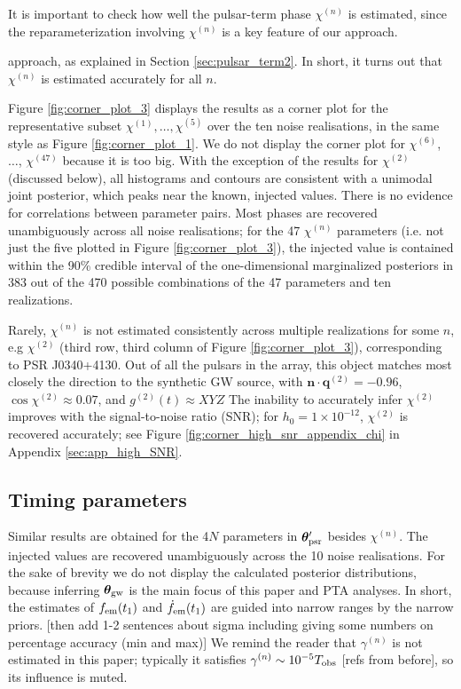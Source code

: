 \documentclass[fleqn,usenatbib,useAMS]{mnras}
\begin{document}
 It is important to check how well the pulsar-term phase $\chi^{(n)}$ is estimated, since the reparameterization involving $\chi^{(n)}$ is a key feature of our approach. 
 
 approach, as explained in Section \ref{sec:pulsar_term2}. In short, it turns out that $\chi^{(n)}$ is estimated accurately for all $n$.
 
 
 
 
 Figure \ref{fig:corner_plot_3} displays the results as a corner plot for the representative subset $\chi^{(1)}, \dots, \chi^{(5)}$ over the ten noise realisations, in the same style as Figure \ref{fig:corner_plot_1}. We do not display the corner plot for $\chi^{(6)}$, $\dots$, $\chi^{(47)}$ because it is too big. With the exception of the results for $\chi^{(2)}$ (discussed below), all histograms and contours are consistent with a unimodal joint posterior, which peaks near the known, injected values. There is no evidence for correlations between parameter pairs. Most phases are recovered unambiguously across all noise realisations; for the 47 $\chi^{(n)}$ parameters (i.e. not just the five plotted in Figure \ref{fig:corner_plot_3}), the injected value is  contained within the 90\% credible interval of the one-dimensional marginalized posteriors in 383 out of the 470 possible combinations of the 47 parameters and ten realizations. 

Rarely, $\chi^{(n)}$ is not estimated consistently across multiple realizations for some $n$, e.g $\chi^{(2)}$ (third row, third column of Figure \ref{fig:corner_plot_3}), corresponding to PSR J0340+4130. Out of all the pulsars in the array, this object matches most closely the direction to the synthetic GW source, with $\boldsymbol{n} \cdot \boldsymbol{q}^{(2)} = -0.96$,  $\cos \chi^{(2)} \approx 0.07$, and $g^{(2)}(t) \approx XYZ$ The inability to accurately infer $\chi^{(2)}$ improves with the signal-to-noise ratio (SNR); for $h_0 = 1 \times 10^{-12}$, $\chi^{(2)}$ is recovered accurately; see Figure \ref{fig:corner_high_snr_appendix_chi} in Appendix \ref{sec:app_high_SNR}. \newline 


\subsection{Timing parameters} \label{sec:timing_parameters}
Similar results are obtained for the 4$N$ parameters in $\boldsymbol{\theta}_{\rm psr}'$ besides $\chi^{(n)}$. The injected values are recovered unambiguously across the 10 noise realisations. For the sake of brevity we do not display the calculated posterior distributions, because inferring $\boldsymbol{\theta}_{\rm gw}$ is the main focus of this paper and PTA analyses. In short, the estimates of $f_{\rm em}(t_1)$ and $\dot{f}_{\rm em}(t_1)$ are guided into narrow ranges by the narrow priors. [then add 1-2 sentences about sigma including giving some numbers on percentage accuracy (min and max)] We remind the reader that $\gamma^{(n)}$ is not estimated in this paper; typically it satisfies $\gamma^{(n)} \sim 10^{-5} T_{\rm obs}$ [refs from before], so its influence is muted. \newline 
\end{document}
